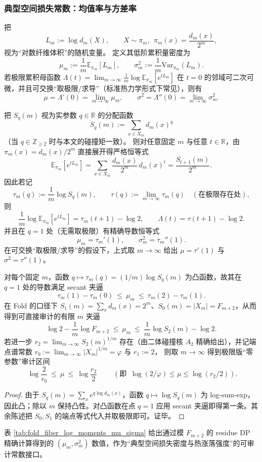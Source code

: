 \subsubsection{典型空间损失常数：均值率与方差率}\label{subsec:pom-fiber-log-moments}
把
\[
L_m:=\log d_m(X),\qquad X\sim \pi_m,\ \ \pi_m(x)=\frac{d_m(x)}{2^m},
\]
视为“对数纤维体积”的随机变量。
定义其低阶累积量密度为
\[
\mu_m:=\frac{1}{m}\mathbb{E}_{\pi_m}[L_m],
\qquad
\sigma_m^2:=\frac{1}{m}\mathrm{Var}_{\pi_m}(L_m).
\]
若极限累积母函数
\(
\Lambda(t)=\lim_{m\to\infty}\frac{1}{m}\log \mathbb{E}_{\pi_m}[e^{tL_m}]
\)
在 \(t=0\) 的邻域可二次可微，并且可交换“取极限/求导”（标准热力学形式下常见），则有
\[
\mu=\Lambda'(0)=\lim_{m\to\infty}\mu_m,\qquad
\sigma^2=\Lambda''(0)=\lim_{m\to\infty}\sigma_m^2.
\]
\begin{remark}[碰撞谱 \texorpdfstring{$\leftrightarrow$}{<->} 典型损失：\texorpdfstring{$\Lambda(t)=\tau(t+1)-\log2$}{Lambda(t)=tau(t+1)-log2}]\label{rem:pom-lambda-tau-shift}
把 \(S_q(m)\) 视为实参数 \(q\in\mathbb{R}\) 的分配函数
\[
S_q(m):=\sum_{x\in X_m} d_m(x)^q
\]
（当 \(q\in\mathbb{Z}_{\ge 2}\) 时与本文的碰撞矩一致）。
则对任意固定 \(m\) 与任意 \(t\in\mathbb{R}\)，由 \(\pi_m(x)=d_m(x)/2^m\) 直接展开得严格恒等式
\[
\mathbb{E}_{\pi_m}[e^{tL_m}]
=\sum_{x\in X_m}\frac{d_m(x)}{2^m}\,d_m(x)^t
=\frac{S_{t+1}(m)}{2^m}.
\]
因此若记
\[
\tau_m(q):=\frac1m\log S_q(m),
\qquad
\tau(q):=\lim_{m\to\infty}\tau_m(q)\quad(\text{在极限存在处}),
\]
则
\[
\frac1m\log \mathbb{E}_{\pi_m}[e^{tL_m}]=\tau_m(t+1)-\log2,
\qquad
\Lambda(t)=\tau(t+1)-\log2.
\]
并且在 \(q=1\) 处（无需取极限）有精确导数恒等式
\[
\mu_m=\tau_m'(1),
\qquad
\sigma_m^2=\tau_m''(1).
\]
在可交换“取极限/求导”的假设下，上式取 \(m\to\infty\) 给出 \(\mu=\tau'(1)\) 与 \(\sigma^2=\tau''(1)\)。
\end{remark}

\begin{corollary}\label{cor:pom-mu-secant-audit}
对每个固定 \(m\)，函数 \(q\mapsto \tau_m(q)=(1/m)\log S_q(m)\) 为凸函数，故其在 \(q=1\) 处的导数满足 secant 夹逼
\[
\boxed{\;
\tau_m(1)-\tau_m(0)\ \le\ \mu_m\ \le\ \tau_m(2)-\tau_m(1).\;}
\]
在 Fold 的口径下 \(S_1(m)=\sum_x d_m(x)=2^m\)、\(S_0(m)=|X_m|=F_{m+2}\)，从而得到可直接审计的有限 \(m\) 夹逼
\[
\boxed{\;
\log2-\frac1m\log F_{m+2}\ \le\ \mu_m\ \le\ \frac1m\log S_2(m)-\log2.\;}
\]
若进一步 \(r_2=\lim_{m\to\infty}S_2(m)^{1/m}\) 存在（由二体碰撞核 \(A_2\) 精确给出），并记端点谱常数
\(
r_0:=\lim_{m\to\infty}|X_m|^{1/m}=\varphi
\)
与
\(
r_1:=2
\)，
则取 \(m\to\infty\) 得到极限版“零参数”审计区间
\[
\boxed{\;
\log\frac{2}{r_0}\ \le\ \mu\ \le\ \log\frac{r_2}{2}\;}
\qquad(\text{即 }\ \log(2/\varphi)\le\mu\le\log(r_2/2)).
\]
\end{corollary}
\begin{proof}
由于 \(S_q(m)=\sum_x e^{q\log d_m(x)}\)，函数 \(q\mapsto \log S_q(m)\) 为 log-sum-exp，因此凸；除以 \(m\) 保持凸性。对凸函数在点 \(q=1\) 应用 secant 夹逼即得第一条。其余陈述把 \(S_0,S_1\) 的端点等式代入并取极限即可。证毕。
\end{proof}
表 \ref{tab:fold_fiber_log_moments_mu_sigma} 给出通过模 \(F_{m+2}\) 的 residue DP 精确计算得到的 \((\mu_m,\sigma_m^2)\) 数值，作为“典型空间损失密度与热涨落强度”的可审计常数接口。

